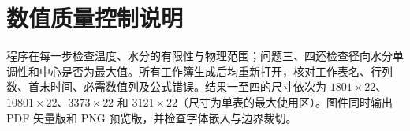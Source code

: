 \section{数值质量控制说明}
程序在每一步检查温度、水分的有限性与物理范围；问题三、四还检查径向水分单调性和中心是否为最大值。所有工作簿生成后均重新打开，核对工作表名、行列数、首末时间、必需数值列及公式错误。结果一至四的尺寸依次为 $1801\times22$、$10801\times22$、$3373\times22$ 和 $3121\times22$（尺寸为单表的最大使用区）。图件同时输出 PDF 矢量版和 PNG 预览版，并检查字体嵌入与边界裁切。
